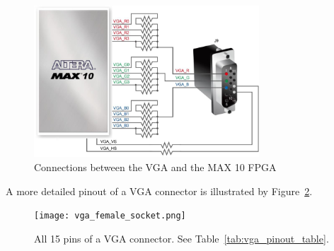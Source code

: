 \documentclass[12pt]{article}
\numberwithin{figure}{section}
\begin{document}
\begin{figure}[ht]
  \centering
  \includegraphics[width=0.75\textwidth]{de10_lite_vga_pinout.png}
  \caption{Connections between the VGA and the MAX 10 FPGA}
  \label{fig:de10_lite_vga_pinout}
\end{figure}

A more detailed pinout of a VGA connector is illustrated by Figure~\ref{fig:vga_connector_pinout}.

\begin{figure}[ht]
  \centering
  \texttt{[image: vga\_female\_socket.png]}
  \caption{All 15 pins of a VGA connector. See Table~\ref{tab:vga_pinout_table}.}
  \label{fig:vga_connector_pinout}
\end{figure}
\end{document}
